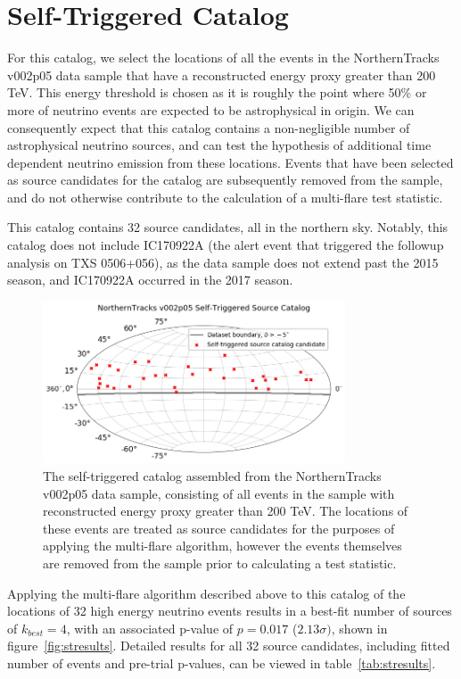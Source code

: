 \section{Self-Triggered Catalog}
For this catalog, we select the locations of all the events in the NorthernTracks v002p05 data sample that have a reconstructed energy proxy greater than 200 TeV. This energy threshold is chosen as it is roughly the point where 50\% or more of neutrino events are expected to be astrophysical in origin. We can consequently expect that this catalog contains a non-negligible number of astrophysical neutrino sources, and can test the hypothesis of additional time dependent neutrino emission from these locations. Events that have been selected as source candidates for the catalog are subsequently removed from the sample, and do not otherwise contribute to the calculation of a multi-flare test statistic. 

This catalog contains 32 source candidates, all in the northern sky. Notably, this catalog does not include IC170922A (the alert event that triggered the followup analysis on TXS 0506+056), as the data sample does not extend past the 2015 season, and IC170922A occurred in the 2017 season. 

\begin{figure}[h]
\centering
\includegraphics[width=0.8\textwidth]{figs/Selftriggeredcat.png}
\caption{The self-triggered catalog assembled from the NorthernTracks v002p05 data sample, consisting of all events in the sample with reconstructed energy proxy greater than 200 TeV. The locations of these events are treated as source candidates for the purposes of applying the multi-flare algorithm, however the events themselves are removed from the sample prior to calculating a test statistic.}
\label{fig:stcat}
\end{figure}

Applying the multi-flare algorithm described above to this catalog of the locations of 32 high energy neutrino events results in a best-fit number of sources of $k_{best}=4$, with an associated p-value of $p=0.017$ ($2.13\sigma)$, shown in figure~\ref{fig:stresults}. Detailed results for all 32 source candidates, including fitted number of events and pre-trial p-values, can be viewed in table~\ref{tab:stresults}. 

